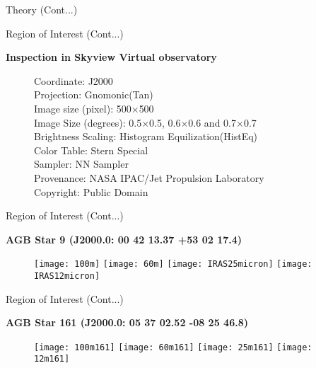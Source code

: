 \documentclass[12pt,a4paper]{beamer}
\begin{document}
\begin{frame}{Theory (Cont...)}
\begin{frame}{Region of Interest (Cont...)}
\begin{block}{\centering\textbf{Inspection in  Skyview Virtual observatory\cite{34} \vspace*{.5cm}}}
\begin{itemize}
\begin{figure}[h]
Coordinate: J2000 \\
Projection: Gnomonic(Tan)\\
Image size (pixel): 500$\times$500\\
Image Size (degrees): 0.5$\times$0.5, 0.6$\times$0.6 and 0.7$\times$0.7\\
Brightness Scaling: Histogram Equilization(HistEq)\\
Color Table: Stern Special\\
Sampler:    NN Sampler\\
Provenance: NASA IPAC/Jet Propulsion Laboratory\\
Copyright: Public Domain\\
\end{figure}
\end{itemize}
\end{block}
\end{frame}

\begin{frame}{Region of Interest (Cont...)}
\begin{block}{\centering\textbf{AGB Star 9 (J2000.0: 00 42 13.37 +53 02 17.4) \cite{34,35} \vspace*{.5cm}}}
\begin{itemize}
\begin{figure}
\vspace{0.0cm} \centering
\texttt{[image: 100m]}
\texttt{[image: 60m]}
\texttt{[image: IRAS25micron]}
\texttt{[image: IRAS12micron]}
\end{figure}
\end{itemize}
\end{block}
\end{frame}

 \begin{frame}{Region of Interest (Cont...)}
\begin{block}{\centering\textbf{AGB Star 161 (J2000.0: 05 37 02.52 -08 25 46.8)\cite{34,35} \vspace*{.5cm}}}
\begin{itemize}
\begin{figure}[h]
\vspace{0.0cm} \centering
\texttt{[image: 100m161]}
\texttt{[image: 60m161]}
\texttt{[image: 25m161]}
\texttt{[image: 12m161]}
\end{figure}
\end{itemize}
\end{block}
\end{frame}


\end{frame}
\end{document}

